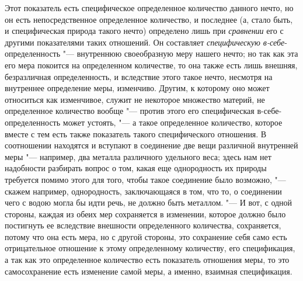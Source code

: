 Этот показатель есть специфическое определенное количество данного нечто, но
он есть непосредственное определенное количество, и последнее (а, стало
быть, и специфическая природа такого нечто) определено лишь при
{\em сравнении} его с другими показателями таких
отношений. Он составляет {\em специфическую в-себе}-определенность "--- внутреннюю своеобразную меру нашего нечто; но
так как эта его мера покоится на определенном количестве, то она также есть
лишь внешняя, безразличная определенность, и вследствие этого такое нечто,
несмотря на внутреннее определение меры, изменчиво. Другим, к которому оно
может относиться как изменчивое, служит не некоторое множество материй, не
определенное количество вообще "--- против этого его специфическая
в-себе-определенность может устоять, "--- а такое определенное количество,
которое вместе с тем есть также показатель такого специфического отношения.
В соотношении находятся и вступают в соединение две вещи различной
внутренней меры "--- например, два металла различного удельного веса; здесь
нам нет надобности разбирать вопрос о том, какая еще однородность их
природы требуется помимо этого для того, чтобы такое соединение было
возможно, "--- скажем например, однородность, заключающаяся в том, что то, о
соединении чего с водою могла бы идти речь, не должно быть металлом. "--- И
вот, с одной стороны, каждая из обеих мер сохраняется в изменении, которое
должно было постигнуть ее вследствие внешности определенного количества,
сохраняется, потому что она есть мера, но с другой стороны, это сохранение
себя само есть отрицательное отношение к этому определенному количеству,
его спецификация, а так как это определенное количество есть показатель
отношения меры, то это самосохранение есть изменение самой меры, а именно,
взаимная спецификация.

